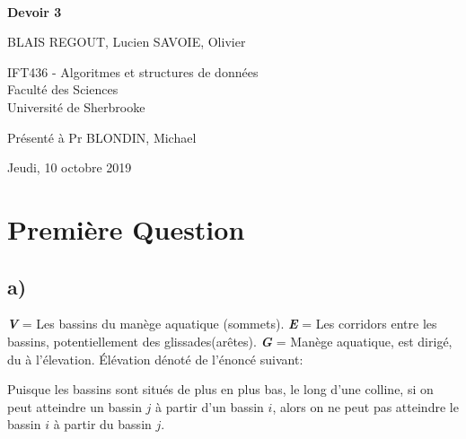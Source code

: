 \documentclass[11pt,a4paper, oneside, oldfontcommands]{memoir}
\begin{document}
\thispagestyle{empty}

{%
\sffamily
\centering
\Large

~\vspace{\fill}

{\huge 
\textbf{Devoir 3}
}

\vspace{2.5cm}

{
BLAIS REGOUT, Lucien
SAVOIE, Olivier
}

\vspace{3.5cm}

IFT436 - Algoritmes et structures de données\\[1em]

Faculté des Sciences\\
Université de Sherbrooke

\vspace{3.5cm}

Présenté à Pr BLONDIN, Michael

\vspace{\fill}

Jeudi, 10 octobre 2019

}%
\chapter{Première Question}
\section{a)}
  \textbf{\textit{V}} = Les bassins du manège aquatique (sommets).
  \textbf{\textit{E}} = Les corridors entre les bassins, potentiellement des glissades(arêtes).
  \textbf{\textit{G}} = Manège aquatique, est dirigé, du à l'élevation.
  Élévation dénoté de l'énoncé suivant:
  \begin{siderules}
    Puisque les bassins sont situés de plus en plus bas, le long d'une colline, si on peut atteindre un bassin $j$ à partir d'un bassin $i$, alors on ne peut pas atteindre le bassin $i$ à partir du bassin $j$.
  \end{siderules}
\end{document}
